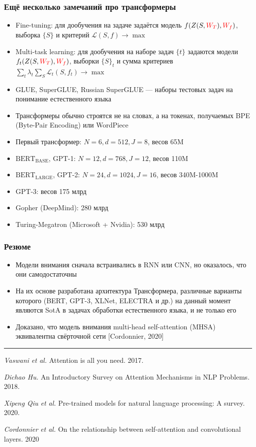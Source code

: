 \documentclass[fullscreen=true, bookmarks=true, hyperref={pdfencoding=unicode}]{beamer}
\begin{document}
\begin{frame}
  \frametitle{Ещё несколько замечаний про трансформеры}

  \begin{itemize}
    \item Fine-tuning: для дообучения на задаче задаётся модель $f(Z(S, {\color{red}W_T}), {\color{red}W_f})$, выборка $\{S\}$ и критерий $\mathcal{L}(S, f) \to \max$
    \item Multi-task learning: для дообучения на наборе задач $\{t\}$ задаются модели $f_t(Z(S, {\color{red}W_T}), {\color{red}W_f})$, выборки $\{S\}_t$ и сумма критериев $ \sum_t \lambda_t \sum_S \mathcal{L}_t(S, f_t) \to \max $
    \item GLUE, SuperGLUE, Russian SuperGLUE — наборы тестовых задач на понимание естественного языка
    \item Трансформеры обычно строятся не на словах, а на токенах, получаемых BPE (Byte-Pair Encoding) или WordPiece
    \pause
    \item Первый трансформер: $N = 6, d = 512, J = 8$, весов 65M
    \item $\text{BERT}_{\text{BASE}}$, GPT-1: $N = 12, d = 768, J = 12$, весов 110M
    \item $\text{BERT}_{\text{LARGE}}$, GPT-2: $N = 24, d = 1024, J = 16$, весов 340M-1000M
    \pause
    \item GPT-3: весов 175 млрд
    \item Gopher (DeepMind): 280 млрд
    \item Turing-Megatron (Microsoft + Nvidia): 530 млрд
  \end{itemize}
\end{frame}


\begin{frame}
  \frametitle{Резюме}
  \begin{itemize}
    \item Модели внимания сначала встраивались в RNN или CNN, но оказалось, что они самодостаточны
    \item На их основе разработана архитектура Трансформера, различные варианты которого (BERT, GPT-3, XLNet, ELECTRA и др.) на данный момент являются SotA в задачах обработки естественного языка, и не только его
    \item Доказано, что модель внимания multi-head self-attention (MHSA) эквивалентна свёрточной сети [Cordonnier, 2020]
  \end{itemize}

  \noindent\rule{8cm}{0.4pt}

  {\small
  {\it Vaswani et al.} Attention is all you need. 2017.

  {\it Dichao Hu.} An Introductory Survey on Attention Mechanisms in NLP Problems. 2018.

  {\it Xipeng Qiu et al.} Pre-trained models for natural language processing: A survey. 2020.

  {\it Cordonnier et al.} On the relationship between self-attention and convolutional layers. 2020}
\end{frame}
\end{document}
